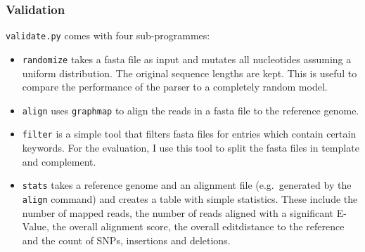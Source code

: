 \documentclass[]{scrartcl}
\begin{document}
\subsubsection{Validation}
\texttt{validate.py} comes with four sub-programmes:
\begin{itemize}
\item \texttt{randomize} takes a fasta file as input and mutates all nucleotides assuming a uniform distribution. The original sequence lengths are kept. This is useful to compare the performance of the parser to a completely random model. 
\item \texttt{align} uses \texttt{graphmap} to align the reads in a fasta file to the reference genome. 
\item \texttt{filter} is a simple tool that filters fasta files for entries which contain certain keywords. For the evaluation, I use this tool to split the fasta files in template and complement. 
\item \texttt{stats} takes a reference genome and an alignment file (e.g.\ generated by the \texttt{align} command) and creates a table with simple statistics. These include the number of mapped reads, the number of reads aligned with a significant E-Value, the overall alignment score, the overall editdistance to the reference and the count of SNPs, insertions and deletions. 
\end{itemize}
\end{document}
